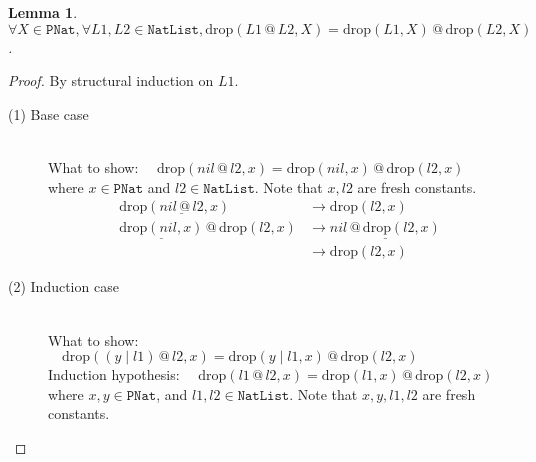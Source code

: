 \documentclass[12pt, a4paper]{article}
\newtheorem{lemma}[theorem]{Lemma}
\newcommand{\rel}[1]{\mathrel{#1}}
\newcommand{\rmx}[1]{\mathrm{#1}}
\newcommand{\larrow}{\longrightarrow}
\newcommand{\under}{\underline}
\begin{document}
\begin{lemma}
\label{lm1}
$\forall X \in \mathtt{PNat}, \forall L1, L2 \in \mathtt{NatList}, \rmx{drop}(L1 \rel{@} L2, X) = \rmx{drop}(L1, X) \rel{@} \rmx{drop}(L2, X)$.
\end{lemma}
\begin{proof}
By structural induction on $L1$.

\begin{description}

\item[(1) Base case]~\\
\noindent
What to show: $\quad \rmx{drop}(nil \rel{@} l2, x) = \rmx{drop}(nil, x) \rel{@} \rmx{drop}(l2, x)$ \\
where $x \in \mathtt{PNat}$ and $l2 \in \mathtt{NatList}$.
Note that $x, l2$ are fresh constants.
\begin{align*}
\rmx{drop}(\under{nil \rel{@} l2}, x)
	&\larrow \rmx{drop}(l2, x) \tag{by @1} \\
\under{\rmx{drop}(nil, x)} \rel{@} \rmx{drop}(l2, x)
	&\larrow \under{nil \rel{@} \rmx{drop}(l2, x)} \tag{by drop1} \\
	&\larrow \rmx{drop}(l2, x) \tag{by @1} 
\end{align*}

\item[(2) Induction case]~\\
What to show: $\quad \rmx{drop}((y \rel{|} l1) \rel{@} l2, x) = \rmx{drop}(y \rel{|} l1, x) \rel{@} \rmx{drop}(l2, x)$ \\
Induction hypothesis: $\quad \rmx{drop}(l1 \rel{@} l2, x) = \rmx{drop}(l1, x) \rel{@} \rmx{drop}(l2, x)$ \\
where $x, y \in \mathtt{PNat}$, and $l1, l2 \in \mathtt{NatList}$.
Note that $x, y, l1, l2$ are fresh constants.


\end{description}
\end{proof}
\end{document}

